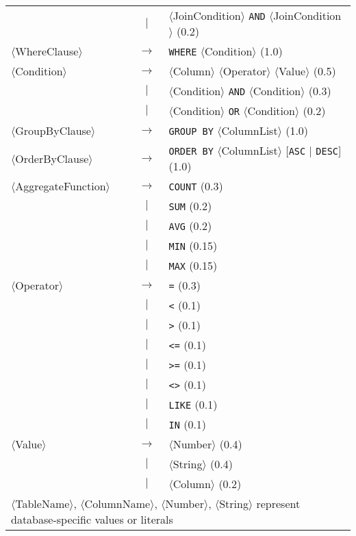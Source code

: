 \begin{table*}[!h]
\begin{tabular}{l@{\ }c@{\ }l}
& $|$ & $\langle$JoinCondition$\rangle$ \texttt{AND} $\langle$JoinCondition$\rangle$  (0.2) \\[1ex]
$\langle$WhereClause$\rangle$ & $\rightarrow$ & \texttt{WHERE} $\langle$Condition$\rangle$  (1.0) \\[1ex]
$\langle$Condition$\rangle$ & $\rightarrow$ & $\langle$Column$\rangle$ $\langle$Operator$\rangle$ $\langle$Value$\rangle$  (0.5) \\
& $|$ & $\langle$Condition$\rangle$ \texttt{AND} $\langle$Condition$\rangle$  (0.3) \\
& $|$ & $\langle$Condition$\rangle$ \texttt{OR} $\langle$Condition$\rangle$  (0.2) \\[1ex]
$\langle$GroupByClause$\rangle$ & $\rightarrow$ & \texttt{GROUP BY} $\langle$ColumnList$\rangle$  (1.0) \\[1ex]
$\langle$OrderByClause$\rangle$ & $\rightarrow$ & \texttt{ORDER BY} $\langle$ColumnList$\rangle$ [\texttt{ASC} $|$ \texttt{DESC}]  (1.0) \\[1ex]
$\langle$AggregateFunction$\rangle$ & $\rightarrow$ & \texttt{COUNT}  (0.3) \\
& $|$ & \texttt{SUM}  (0.2) \\
& $|$ & \texttt{AVG}  (0.2) \\
& $|$ & \texttt{MIN}  (0.15) \\
& $|$ & \texttt{MAX}  (0.15) \\[1ex]
$\langle$Operator$\rangle$ & $\rightarrow$ & \texttt{=}  (0.3) \\
& $|$ & \texttt{<}  (0.1) \\
& $|$ & \texttt{>}  (0.1) \\
& $|$ & \texttt{<=}  (0.1) \\
& $|$ & \texttt{>=}  (0.1) \\
& $|$ & \texttt{<>}  (0.1) \\
& $|$ & \texttt{LIKE}  (0.1) \\
& $|$ & \texttt{IN}  (0.1) \\[1ex]
$\langle$Value$\rangle$ & $\rightarrow$ & $\langle$Number$\rangle$  (0.4) \\
& $|$ & $\langle$String$\rangle$  (0.4) \\
& $|$ & $\langle$Column$\rangle$  (0.2) \\[1ex]
\multicolumn{3}{l}{$\langle$TableName$\rangle$, $\langle$ColumnName$\rangle$, $\langle$Number$\rangle$, $\langle$String$\rangle$ represent database-specific values or literals} \\
\bottomrule
\end{tabular}
\end{table*}






